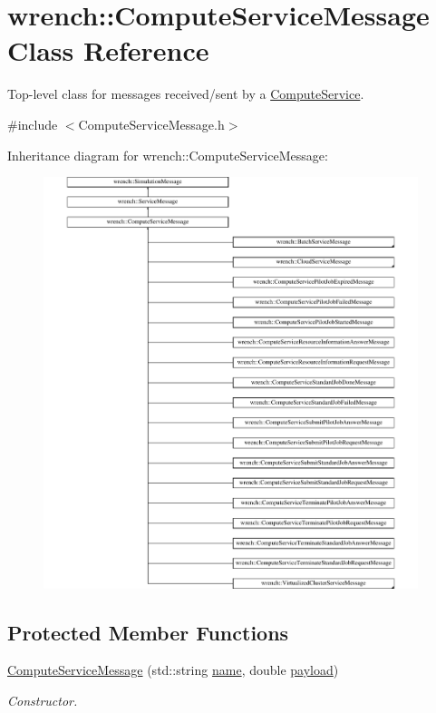 \hypertarget{classwrench_1_1_compute_service_message}{}\section{wrench\+:\+:Compute\+Service\+Message Class Reference}
\label{classwrench_1_1_compute_service_message}


Top-\/level class for messages received/sent by a \hyperlink{classwrench_1_1_compute_service}{Compute\+Service}.  




{\ttfamily \#include $<$Compute\+Service\+Message.\+h$>$}

Inheritance diagram for wrench\+:\+:Compute\+Service\+Message\+:\begin{figure}[H]
\begin{center}
\leavevmode
\includegraphics[height=12.000000cm]{classwrench_1_1_compute_service_message}
\end{center}
\end{figure}
\subsection*{Protected Member Functions}
\begin{DoxyCompactItemize}
\item 
\hyperlink{classwrench_1_1_compute_service_message_a73dec6bc723dea40a67b0933fa115a0f}{Compute\+Service\+Message} (std\+::string \hyperlink{classwrench_1_1_simulation_message_ab224f6dd8ec5ee2e7f65bfcdf2b8a86b}{name}, double \hyperlink{classwrench_1_1_simulation_message_a914f2732713f7c02898e66f05a7cb8a1}{payload})
\begin{DoxyCompactList}\small\item\em Constructor. \end{DoxyCompactList}\end{DoxyCompactItemize}
